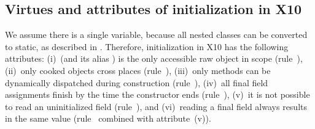 \subsection{Virtues and attributes of initialization in X10}
We assume there is a single \this variable, because all nested classes can be converted to static,
    as described in .
Therefore, initialization in X10 has the following attributes:
(i)~\this (and its alias ) is the only accessible raw object in scope (rule~),
(ii)~only cooked objects cross places (rule~),
(iii)~only  methods can be dynamically dispatched during construction (rule~),
(iv)~all final field assignments finish by the time the constructor ends (rule~),
(v)~it is not possible to read an uninitialized field (rule~), and
(vi)~reading a final field always results in the same value (rule~ combined with attribute~(v)).
